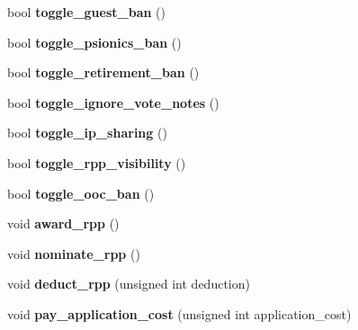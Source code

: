 \begin{DoxyCompactItemize}
\item 
\hypertarget{classaccount_a5665e374e84979e1a44deaa21aa64425}{bool {\bfseries toggle\-\_\-guest\-\_\-ban} ()}\label{classaccount_a5665e374e84979e1a44deaa21aa64425}

\item 
\hypertarget{classaccount_a55ffa6cc79590c1ad7bcdcc34773ad40}{bool {\bfseries toggle\-\_\-psionics\-\_\-ban} ()}\label{classaccount_a55ffa6cc79590c1ad7bcdcc34773ad40}

\item 
\hypertarget{classaccount_ad6b872530fb10d791bb65461f5d75bef}{bool {\bfseries toggle\-\_\-retirement\-\_\-ban} ()}\label{classaccount_ad6b872530fb10d791bb65461f5d75bef}

\item 
\hypertarget{classaccount_af1620f171e4ce24029ec022bde96b87a}{bool {\bfseries toggle\-\_\-ignore\-\_\-vote\-\_\-notes} ()}\label{classaccount_af1620f171e4ce24029ec022bde96b87a}

\item 
\hypertarget{classaccount_a6ce6cc28b05a5a25001d2b367e902426}{bool {\bfseries toggle\-\_\-ip\-\_\-sharing} ()}\label{classaccount_a6ce6cc28b05a5a25001d2b367e902426}

\item 
\hypertarget{classaccount_afb8ff878e54dacc069ec9281b1d85700}{bool {\bfseries toggle\-\_\-rpp\-\_\-visibility} ()}\label{classaccount_afb8ff878e54dacc069ec9281b1d85700}

\item 
\hypertarget{classaccount_a9404079c48a6a7634d58bb8c651a6f8d}{bool {\bfseries toggle\-\_\-ooc\-\_\-ban} ()}\label{classaccount_a9404079c48a6a7634d58bb8c651a6f8d}

\item 
\hypertarget{classaccount_a29e4034d96e5beae49163df114458772}{void {\bfseries award\-\_\-rpp} ()}\label{classaccount_a29e4034d96e5beae49163df114458772}

\item 
\hypertarget{classaccount_a84d07d9e4fbc89bf7caba589437968f8}{void {\bfseries nominate\-\_\-rpp} ()}\label{classaccount_a84d07d9e4fbc89bf7caba589437968f8}

\item 
\hypertarget{classaccount_ab06de856e2c3c2cb433e810ce27dcba7}{void {\bfseries deduct\-\_\-rpp} (unsigned int deduction)}\label{classaccount_ab06de856e2c3c2cb433e810ce27dcba7}

\item 
\hypertarget{classaccount_afbb5827b42878259de2c5843331b00a2}{void {\bfseries pay\-\_\-application\-\_\-cost} (unsigned int application\-\_\-cost)}\label{classaccount_afbb5827b42878259de2c5843331b00a2}

\end{DoxyCompactItemize}
